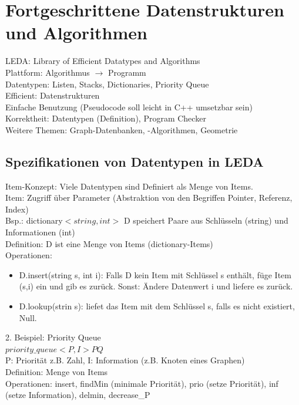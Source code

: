 \documentclass[a4paper]{article}
\begin{document}
\section*{Fortgeschrittene Datenstrukturen und Algorithmen}
LEDA: Library of Efficient Datatypes and Algorithms\\
Plattform: Algorithmus $\rightarrow$ Programm\\
Datentypen:  Listen, Stacks, Dictionaries, Priority Queue\\
Efficient: Datenstrukturen\\
Einfache Benutzung (Pseudocode soll leicht in C++ umsetzbar sein)\\
Korrektheit: Datentypen (Definition), Program Checker\\
Weitere Themen: Graph-Datenbanken, -Algorithmen, Geometrie\\
\subsection*{Spezifikationen von Datentypen in LEDA}
Item-Konzept: Viele Datentypen sind Definiert als Menge von Items.\\
Item: Zugriff über Parameter (Abstraktion von den Begriffen Pointer, Referenz, Index)\\
Bsp.: dictionary$<string, int>$ D speichert Paare aus Schlüsseln (string) und Informationen (int)\\
Definition: D ist eine Menge von Items (dictionary-Items)\\
Operationen: \\
\begin{itemize}
\item D.insert(string s, int i): Falls D kein Item mit Schlüssel s enthält, füge Item (s,i) ein und gib es zurück. Sonst: Ändere Datenwert i und liefere es zurück.
\item D.lookup(strin s): liefet das Item mit dem Schlüssel s, falls es nicht existiert, Null.
\end{itemize}
2. Beispiel: Priority Queue\\
$priority\_queue<P,I> PQ$\\
P: Priorität z.B. Zahl, I: Information (z.B. Knoten eines Graphen)\\
Definition: Menge von Items\\
Operationen: insert, findMin (minimale Priorität), prio (setze Priorität), inf (setze Information), delmin, decrease\_P\\
\end{document}
